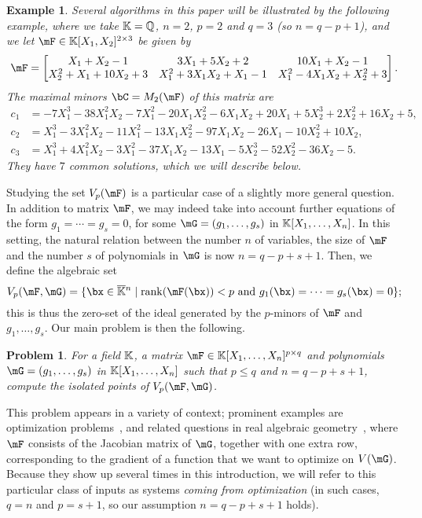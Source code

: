 \documentclass[12pt]{article}
\newtheorem{pbm}{Problem}
\newtheorem{example}[definition]{Example}
\begin{document}
\begin{example}\label{ex:1}
  Several algorithms in this paper will be illustrated by the
  following example, where we take $\mathbb{K}=\mathbb{Q}$, $n=2$, $p=2$ and $q=3$
  (so $n=q-p+1$), and we let $\mF \in \K[X_1,X_2]^{2 \times 3}$ be
  given by
  $$\mF=\begin{bmatrix}
  X_1+X_2-1 & 3X_1+5X_2+2  & 10X_1+X_2-1\\
  X_2^2+X_1+10X_2+3   & X_1^2+3X_1X_2+X_1-1  & X_1^2-4X_1X_2+X_2^2+3
  \end{bmatrix}.$$
  The maximal minors $\bC=M_2(\mF)$ of this matrix are
  \begin{align*}
   c_1&= -7X_1^3 - 38X_1^2X_2 - 7X_1^2 - 20X_1X_2^2 - 6X_1X_2 + 20X_1 + 5X_2^3 +    2X_2^2 + 16X_2 + 5,\\
   c_2&=    X_1^3 - 3X_1^2X_2 - 11X_1^2 - 13X_1X_2^2 - 97X_1X_2 - 26X_1 - 10X_2^2 +    10X_2,\\
   c_3&=    X_1^3 + 4X_1^2X_2 - 3X_1^2 - 37X_1X_2 - 13X_1 - 5X_2^3 - 52X_2^2 - 36X_2 - 5.
  \end{align*}
  They have $7$ common solutions, which we will describe below.
\end{example}



Studying the set $\VpF{p}{\mF}$ is a particular case of a slightly
more general question. In addition to matrix $\mF$, we may indeed take
into account further equations of the form $g_1 =\cdots=g_s=0$, for
some $\mG=(g_1,\dots,g_s)$ in $\mathbb{K}[X_1,\dots,X_n]$. In this setting, the
natural relation between the number $n$ of variables, the size of
$\mF$ and the number $s$ of polynomials in $\mG$ is now
$n=q-p+s+1$. Then, we define the algebraic set
$$\VpFG{p}{\mF}{\mG} = \{\bx \in \KKbar{}^n \mid
\mathrm{rank}(\mF({\bx})) < p \text{~and~} g_1(\bx)=\cdots=g_s(\bx)=0
\};$$ this is thus the zero-set of the ideal generated by the
$p$-minors of $\mF$ and $ g_1,\dots,g_s$. Our main problem is then the following.
\begin{pbm} \label{problem2} 
  For a field $\mathbb{K}$, a matrix $\mF \in \KK[X_1,\dots,X_n]^{p \times q}$ and
  polynomials $\mG=(g_1,\dots,g_s)$ in $\mathbb{K}[X_1,\dots,X_n]$ such that 
  $p \leq q$ and   $n = q-p+s+1$, compute the isolated points of $\VpFG{p}{\mF}{\mG}$.
\end{pbm}
This problem appears in a variety of context; prominent examples are
optimization problems~\cite{GSZ10,JP14,BGHS14,GS14,NDS06}, and related
questions in real algebraic
geometry~\cite{ARS,BaGiHeMb01,BaGiHePa05,BGHSS,BRSS,RealDecompICMS,CellDecompSurface,BertiniReal,RealNumerical,SaSc03,SaSc11,SaSc17},
where $\mF$ consists of the Jacobian matrix of $\mG$, together with
one extra row, corresponding to the gradient of a function that we
want to optimize on $V(\mG)$. Because they show up several times in
this introduction, we will refer to this particular class of inputs as
systems {\em coming from optimization} (in such cases, $q=n$ and $p=s+1$, 
so our assumption $n=q-p+s+1$ holds).
\end{document}
